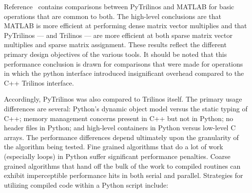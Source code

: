 \documentclass[11pt]{article}
\begin{document}
Reference~\cite{PyTrilinos} contains comparisons between PyTrilinos and MATLAB for basic operations that are common to both.  The high-level conclusions are that MATLAB is more efficient at performing dense matrix vector multiplies and that PyTrilinos --- and Trilinos --- are more efficient at both sparse matrix vector multiplies and sparse matrix assignment.  These results reflect the different primary design objectives of the various tools.  It should be noted that this performance conclusion is drawn for comparisons that were made for operations in which the python interface introduced insignificant overhead compared to the C++ Trilinos interface.

Accordingly, PyTrilinos was also compared to Trilinos itself.  The primary usage differences are several: Python's dynamic object model versus the static typing of C++; memory management concerns present in C++ but not in Python; no header files in Python; and high-level containers in Python versus low-level C arrays.  The performance differences depend ultimately upon the granularity of the algorithm being tested.  Fine grained algorithms that do a lot of work (especially loops) in Python suffer significant performance penalties.  Coarse grained algorithms that hand off the bulk of the work to compiled routines can exhibit imperceptible performance hits in both serial and parallel.  Strategies for utilizing compiled code within a Python script include:
\end{document}
